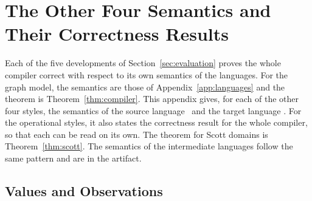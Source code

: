 
\raggedbottom
\allowdisplaybreaks
\section{The Other Four Semantics and Their Correctness Results}
\label{app:other}

Each of the five developments of Section~\ref{sec:evaluation} proves
the whole compiler correct with respect to its own semantics of the
languages. For the graph model, the semantics are those of
Appendix~\ref{app:languages} and the theorem is
Theorem~\ref{thm:compiler}. This appendix gives, for each of the other
four styles, the semantics of the source language \fpc\ and the
target language \instr. For the operational styles, it also states
the correctness result for the whole compiler, so that each can be
read on its own. The theorem for Scott domains is
Theorem~\ref{thm:scott}. The semantics
of the intermediate languages follow the same pattern and are in the
artifact.

\subsection{Values and Observations}
\label{app:observations}

